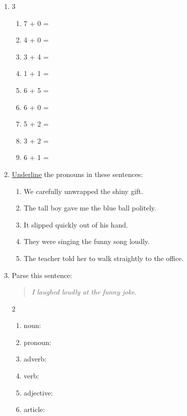 \documentclass{tufte-book}
\begin{document}
\begin{enumerate}
  \item
  \begin{multicols}{3}
    \begin{enumerate}\bigskip
      \item 7 + 0 = \dotfill\bigskip
      \item 4 + 0 = \dotfill\bigskip
      \item 3 + 4 = \dotfill
      \item 1 + 1 = \dotfill\bigskip
      \item 6 + 5 = \dotfill\bigskip
      \item 6 + 0 = \dotfill
      \item 5 + 2 = \dotfill\bigskip
      \item 3 + 2 = \dotfill\bigskip
      \item 6 + 1 = \dotfill
    \end{enumerate}
  \end{multicols}

  \item \underline{Underline} the pronouns in these sentences:
  \begin{enumerate}
    \item We carefully unwrapped the shiny gift.
    \item The tall boy gave me the blue ball politely.
    \item It slipped quickly out of his hand.
    \item They were singing the funny song loudly.
    \item The teacher told her to walk straightly to the office.
  \end{enumerate}

  \item Parse this sentence:
  \begin{quote}
    \textit{I laughed loudly at the funny joke.}
  \end{quote}
  \begin{multicols}{2}
  \begin{enumerate}\bigskip
    \item noun: \dotfill\bigskip
    \item pronoun: \dotfill\bigskip
    \item adverb: \dotfill
    \item verb: \dotfill\bigskip
    \item adjective: \dotfill\bigskip
    \item article: \dotfill
  \end{enumerate}
  \end{multicols}


\end{enumerate}
\end{document}
